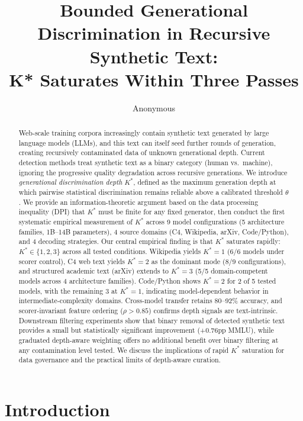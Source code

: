 \documentclass[11pt]{article}
\title{Bounded Generational Discrimination in Recursive Synthetic Text:\\K* Saturates Within Three Passes}
\author{Anonymous}
\date{}
\newcommand{\kstar}{K^*}
\newcommand{\thetaval}{\theta}
\begin{document}
\maketitle

\begin{abstract}
Web-scale training corpora increasingly contain synthetic text generated by large language models (LLMs), and this text can itself seed further rounds of generation, creating recursively contaminated data of unknown generational depth.
Current detection methods treat synthetic text as a binary category (human vs.\ machine), ignoring the progressive quality degradation across recursive generations.
We introduce \emph{generational discrimination depth} $\kstar$, defined as the maximum generation depth at which pairwise statistical discrimination remains reliable above a calibrated threshold $\thetaval$.
We provide an information-theoretic argument based on the data processing inequality (DPI) that $\kstar$ must be finite for any fixed generator, then conduct the first systematic empirical measurement of $\kstar$ across 9 model configurations (5 architecture families, 1B--14B parameters), 4 source domains (C4, Wikipedia, arXiv, Code/Python), and 4 decoding strategies.
Our central empirical finding is that $\kstar$ saturates rapidly: $\kstar \in \{1,2,3\}$ across all tested conditions.
Wikipedia yields $\kstar{=}1$ (6/6 models under scorer control), C4 web text yields $\kstar{=}2$ as the dominant mode (8/9 configurations), and structured academic text (arXiv) extends to $\kstar{=}3$ (5/5 domain-competent models across 4 architecture families).
Code/Python shows $\kstar{=}2$ for 2 of 5 tested models, with the remaining 3 at $\kstar{=}1$, indicating model-dependent behavior in intermediate-complexity domains.
Cross-model transfer retains 80--92\% accuracy, and scorer-invariant feature ordering ($\rho{>}0.85$) confirms depth signals are text-intrinsic.
Downstream filtering experiments show that binary removal of detected synthetic text provides a small but statistically significant improvement (+0.76pp MMLU), while graduated depth-aware weighting offers no additional benefit over binary filtering at any contamination level tested.
We discuss the implications of rapid $\kstar$ saturation for data governance and the practical limits of depth-aware curation.
\end{abstract}


\section{Introduction}
\end{document}
